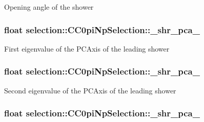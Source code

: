 Opening angle of the shower \hypertarget{classselection_1_1CC0piNpSelection_a47b08d4ae98f51032f431873321914a5}{
\subsubsection[{\-\_\-shr\-\_\-pca\-\_\-0}]{\setlength{\rightskip}{0pt plus 5cm}float selection\-::\-C\-C0pi\-Np\-Selection\-::\-\_\-shr\-\_\-pca\-\_\hspace{0.3cm}{\ttfamily [private]}}}\label{classselection_1_1CC0piNpSelection_a47b08d4ae98f51032f431873321914a5}
First eigenvalue of the P\-C\-Axis of the leading shower \hypertarget{classselection_1_1CC0piNpSelection_ae3ce85b9e7002cfac57e433ee131868d}{
\subsubsection[{\-\_\-shr\-\_\-pca\-\_\-1}]{\setlength{\rightskip}{0pt plus 5cm}float selection\-::\-C\-C0pi\-Np\-Selection\-::\-\_\-shr\-\_\-pca\-\_\hspace{0.3cm}{\ttfamily [private]}}}\label{classselection_1_1CC0piNpSelection_ae3ce85b9e7002cfac57e433ee131868d}
Second eigenvalue of the P\-C\-Axis of the leading shower \hypertarget{classselection_1_1CC0piNpSelection_a7e5a1ac6cd32eec7da00eb45c49df0cd}{
\subsubsection[{\-\_\-shr\-\_\-pca\-\_\-2}]{\setlength{\rightskip}{0pt plus 5cm}float selection\-::\-C\-C0pi\-Np\-Selection\-::\-\_\-shr\-\_\-pca\-\_\hspace{0.3cm}{\ttfamily [private]}}}\label{classselection_1_1CC0piNpSelection_a7e5a1ac6cd32eec7da00eb45c49df0cd}
